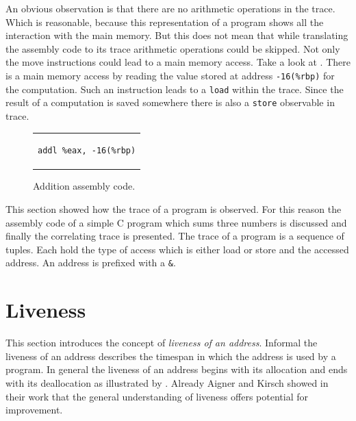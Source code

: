 \documentclass[onecolumn, openright, master, english, signatures]{dbrgrptt}
\begin{document}
An obvious observation is that there are no arithmetic operations in the \ac{trace}. Which is reasonable, because this representation of a program shows all the interaction with the main memory. But this does not mean that while translating the assembly code to its \ac{trace} arithmetic operations could be skipped. Not only the move instructions could lead to a main memory access. Take a look at . There is a main memory access by reading the value stored at address \texttt{-16(\%rbp)} for the computation. Such an instruction leads to a \texttt{load} within the \ac{trace}. Since the result of a computation is saved somewhere there is also a \texttt{store} observable in \ac{trace}.

\begin{figure}[!ht]
  \centering
  \begin{tabular}{c}
  \begin{lstlisting}
addl %eax, -16(%rbp)
  \end{lstlisting}
  \end{tabular}
  \caption{Addition assembly code.}
  \label{fig:mat-example-addition-detail}
\end{figure}

This section showed how the \ac{trace} of a program is observed. For this reason the assembly code of a simple C program which sums three numbers is discussed and finally the correlating \ac{trace} is presented. The \ac{trace} of a program is a sequence of tuples. Each hold the type of access which is either load or store and the accessed address. An address is prefixed with a \texttt{\&}.


\section{Liveness}\label{sec:liveness}

This section introduces the concept of \emph{liveness of an address}. Informal the liveness of an address describes the timespan in which the address is used by a program. In general the liveness of an address begins with its allocation and ends with its deallocation as illustrated by . Already Aigner and Kirsch showed in their work \cite{aigner2013acdc} that the general understanding of liveness offers potential for improvement.
\end{document}
